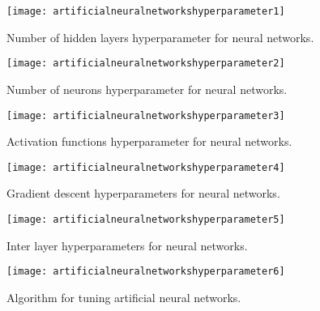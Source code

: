  	\begin{figure}[h]
		\centering
		\texttt{[image: artificialneuralnetworkshyperparameter1]}
		\caption[Number of hidden layers hyperparameter for neural networks]{Number of hidden layers hyperparameter for neural networks.}
		\label{fig:artificialneuralnetworkshyperparameter1}
	\end{figure}
 	\begin{figure}[h]
		\centering
		\texttt{[image: artificialneuralnetworkshyperparameter2]}
		\caption[Number of neurons hyperparameter for neural networks]{Number of neurons hyperparameter for neural networks.}
		\label{fig:artificialneuralnetworkshyperparameter2}
	\end{figure}
 	\begin{figure}[h]
		\centering
		\texttt{[image: artificialneuralnetworkshyperparameter3]}
		\caption[Activation functions hyperparameter for neural networks]{Activation functions hyperparameter for neural networks.}
		\label{fig:artificialneuralnetworkshyperparameter3}
	\end{figure}
 	\begin{figure}[h]
		\centering
		\texttt{[image: artificialneuralnetworkshyperparameter4]}
		\caption[Gradient descent hyperparameters for neural networks]{Gradient descent hyperparameters for neural networks.}
		\label{fig:artificialneuralnetworkshyperparameter4}
	\end{figure}
 	\begin{figure}[h]
		\centering
		\texttt{[image: artificialneuralnetworkshyperparameter5]}
		\caption[Inter layer hyperparameters for neural networks]{Inter layer hyperparameters for neural networks.}
		\label{fig:artificialneuralnetworkshyperparameter5}
	\end{figure}
 	\begin{figure}[h]
		\centering
		\texttt{[image: artificialneuralnetworkshyperparameter6]}
		\caption[Algorithm for tuning artificial neural networks]{Algorithm for tuning artificial neural networks.}
		\label{fig:artificialneuralnetworkshyperparameter6}
	\end{figure}
